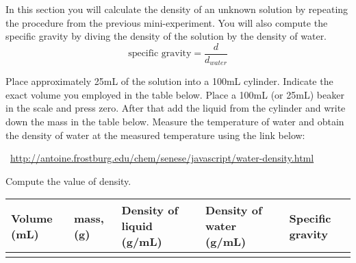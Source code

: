 \documentclass[main.tex]{subfiles}
\begin{document}
\vspace{0.2cm}{\large \bfseries 2. Density of a solution}
In this section you will calculate the density of an unknown solution by repeating the procedure from the previous mini-experiment. You will also compute the specific gravity by diving the density of the solution by the density of water.
\begin{equation*}
\text{specific gravity}=\frac{d}{d_{water}}
\end{equation*}

\begin{steps}
    \newstep[] Place approximately 25mL of the solution into a 100mL cylinder. Indicate the exact volume you employed in the table below.    
    \newstep[] Place a 100mL (or 25mL) beaker in the scale and press zero. After that add the liquid from the cylinder and write down the mass in the table below.
    \newstep[]  Measure the temperature of water and obtain the density of water at the measured temperature using the link below: 
\begin{center}\Mundus~\url{http://antoine.frostburg.edu/chem/senese/javascript/water-density.html}\end{center}\vspace{.5cm}
     \newstep[] Compute the value of density.
\end{steps}

 
\begin{center}\resizebox{18cm}{!} {
 \begin{tabular}{ |p{2cm}|p{3.5cm}|p{5.5cm}|p{3.5cm}|p{2.5cm}|  }
\hline
    Volume (mL) &  mass, (g) & Density of liquid (g/mL)& Density of water (g/mL)& Specific gravity         \\
\hline
   \vspace{0cm}\vspace{5cm} &     &   &&         \\
\hline
\end{tabular} 
}\end{center}
\end{document}
